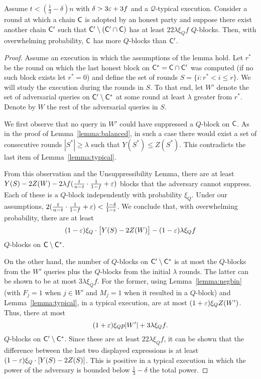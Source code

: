 \begin{lemma}\label{lemma:qblockcommonprefix}
	Assume $t<(\frac13-\delta)n$ with $\delta>3\varepsilon+3f$ and a $\mathcal{Q}$-typical
	execution.
	Consider a round at which a chain $\mathsf{C}$ is adopted by an honest party and
	suppose there exist another chain $\mathsf{C}'$ such that
	$\mathsf{C}'\setminus(\mathsf{C}'\cap\mathsf{C})$ has at least $22\lambda\xi_Qf$ $Q$-blocks.
	Then, with overwhelming probability, $\mathsf{C}$ has more $Q$-blocks than $\mathsf{C}'$.
\end{lemma}
\begin{proof}
	Assume an execution in which the assumptions of the lemma hold.
	Let $r^*$ be the round on which the last honest block on
	$\mathsf{C}^*=\mathsf{C}\cap\mathsf{C}'$ was computed (if no such block exists let
	$r^*=0$) and define the set of rounds $S=\{i:r^*<i\leq r\}$.
	We will study the execution during the rounds in $S$.
	To that end, let $W'$ denote the set of adversarial queries
	on $\mathsf{C}'\setminus\mathsf{C}^*$ at some round at least $\lambda$ greater from
	$r^*$. Denote by $W$ the rest of the adversarial queries in $S$.

	We first observe that no query in $W'$ could have suppressed
	a $Q$-block on $\mathsf{C}$.
	As in the proof of Lemma~\ref{lemma:balanced}, in such a case there would
	exist a set of consecutive rounds $|S^*|\geq\lambda$ such that $Y(S^*)\leq
	Z(S^*)$.
	This contradicts the last item of Lemma~\ref{lemma:typical}.

	From this observation and the Unsuppressibility Lemma, there are at least
	$Y(S)-2Z(W)-2\lambda f(\frac t{n-t}\cdot\frac1{1-f}+\varepsilon)$
	blocks that the adversary cannot
	suppress.
	Each of these is a $Q$-block independently with probability $\xi_Q$.
	Under our assumptions,
	$2(\frac t{n-t}\cdot\frac1{1-f}+\varepsilon)<\frac{1-\delta}{1-\varepsilon}$.
	We conclude that, with overwhelming probability, there are at least
	\[
		(1-\varepsilon)\xi_Q\cdot\bigl[Y(S)-2Z(W)\bigr]-(1-\varepsilon)\lambda\xi_Qf
	\]
	$Q$-blocks on $\mathsf{C}\setminus\mathsf{C}^*$.

	On the other hand, the number of $Q$-blocks on $\mathsf{C}'\setminus\mathsf{C}^*$ is
	at most the $Q$-blocks from the $W'$ queries plus the $Q$-blocks
	from the initial $\lambda$ rounds.
	The latter can be shown to be at most $3\lambda\xi_Qf$.
	For the former, using Lemma~\ref{lemma:negbin} (with
	$F_j=1$ when $j\in W'$ and $M_j=1$ when it resulted in a $Q$-block) and
	Lemma~\ref{lemma:typical}, in a typical execution, are at most
	$(1+\varepsilon)\xi_QZ(W')$. Thus, there at most
	\[
		(1+\varepsilon)\xi_Qp|W'|+3\lambda\xi_Qf
	.\]
	$Q$-blocks on $\mathsf{C}'\setminus\mathsf{C}^*$.
	Since these are at least $22\lambda\xi_Qf$, it can be shown that
	the difference between the last two displayed expressions is at least
	$(1-\varepsilon)\xi_Q\cdot[Y(S)-2Z(S)]$. This is positive in a typical execution
	in which the power of the adversary is bounded below $\frac13-\delta$ the
	total power.
\end{proof}

